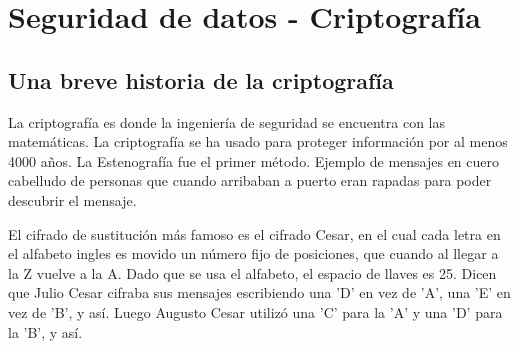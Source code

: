\chapter{Seguridad de datos - Criptografía}
\vspace{95px}
\begin{flushright}
    \textit{ }
\end{flushright}
 



\section{Una breve historia de la criptografía}
La criptografía es donde la ingeniería de seguridad se encuentra con las matemáticas. 
La criptografía se ha usado para proteger información por al menos 4000 años. La Estenografía fue el primer método. Ejemplo de mensajes en cuero cabelludo de personas que cuando arribaban a puerto eran rapadas para poder descubrir el mensaje.  




El cifrado de sustitución más famoso es el cifrado Cesar, en el cual cada letra en el alfabeto ingles es movido un número fijo de posiciones, que cuando al llegar a la Z vuelve a la A. Dado que se usa el alfabeto, el espacio de llaves es 25.
%
Dicen que Julio Cesar cifraba sus mensajes escribiendo una 'D' en vez de 'A', una 'E' en vez de 'B', y así. Luego Augusto Cesar utilizó una 'C' para la 'A' y una 'D' para la 'B', y así. 


